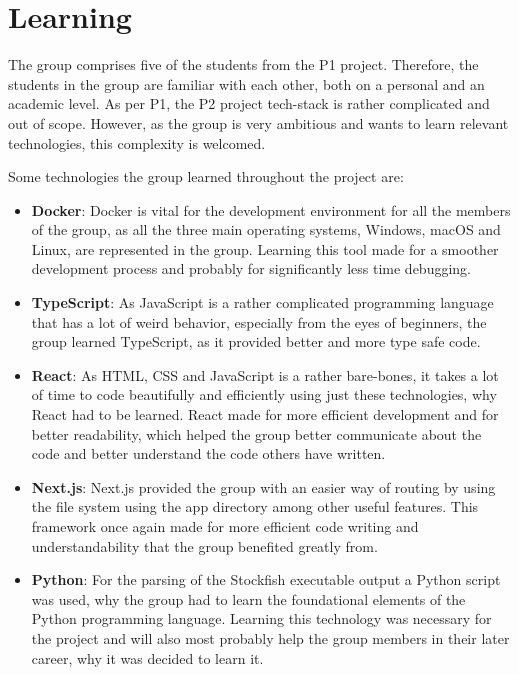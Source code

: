 \section{Learning}\label{sec:learning}

The group comprises five of the students from the P1 project.
Therefore, the students in the group are familiar with each other, both on a personal and an academic level.
As per P1, the P2 project tech-stack is rather complicated and out of scope.
However, as the group is very ambitious and wants to learn relevant technologies, this complexity is welcomed.

Some technologies the group learned throughout the project are:

\begin{itemize}
    \item \textbf{Docker}: Docker is vital for the development environment for all the members of the group, as all the
    three main operating systems, Windows, macOS and Linux, are represented in the group.
    Learning this tool made for a smoother development process and probably for significantly less time debugging.
    \item \textbf{TypeScript}: As JavaScript is a rather complicated programming language that has a lot of weird
    behavior, especially from the eyes of beginners, the group learned TypeScript, as it provided better and more
    type safe code.
    \item \textbf{React}: As HTML, CSS and JavaScript is a rather bare-bones, it takes a lot of time to code beautifully
    and efficiently using just these technologies, why React had to be learned.
    React made for more efficient development and for better readability, which helped the group better communicate
    about the code and better understand the code others have written.
    \item \textbf{Next.js}: Next.js provided the group with an easier way of routing by using the file system using the
    app directory among other useful features.
    This framework once again made for more efficient code writing and understandability that the group benefited
    greatly from.
    \item \textbf{Python}: For the parsing of the Stockfish executable output a Python script was used, why the group
    had to learn the foundational elements of the Python programming language.
    Learning this technology was necessary for the project and will also most probably help the group members in their
    later career, why it was decided to learn it.
\end{itemize}
